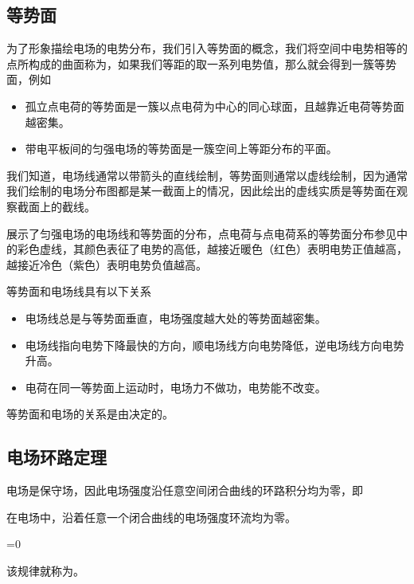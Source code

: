 \subsection{等势面}
为了形象描绘电场的电势分布，我们引入等势面的概念，我们将空间中电势相等的点所构成的曲面称为，如果我们等距的取一系列电势值，那么就会得到一簇等势面，例如
\begin{itemize}
    \item 孤立点电荷的等势面是一簇以点电荷为中心的同心球面，且越靠近电荷等势面越密集。
    \item 带电平板间的匀强电场的等势面是一簇空间上等距分布的平面。
\end{itemize}
我们知道，电场线通常以带箭头的直线绘制，等势面则通常以虚线绘制，因为通常我们绘制的电场分布图都是某一截面上的情况，因此绘出的虚线实质是等势面在观察截面上的截线。

展示了匀强电场的电场线和等势面的分布，点电荷与点电荷系的等势面分布参见中的彩色虚线，其颜色表征了电势的高低，越接近暖色（红色）表明电势正值越高，越接近冷色（紫色）表明电势负值越高。

等势面和电场线具有以下关系
\begin{itemize}
    \item 电场线总是与等势面垂直，电场强度越大处的等势面越密集。
    \item 电场线指向电势下降最快的方向，顺电场线方向电势降低，逆电场线方向电势升高。
    \item 电荷在同一等势面上运动时，电场力不做功，电势能不改变。
\end{itemize}
等势面和电场的关系是由决定的。\vspace{-3pt}

\subsection{电场环路定理}
电场是保守场，因此电场强度沿任意空间闭合曲线的环路积分均为零，即
\begin{BoxPrinciple}[电场环路定理]
    在电场中，沿着任意一个闭合曲线的电场强度环流均为零。
    \begin{BoxEq}
        =0
    \end{BoxEq}
\end{BoxPrinciple}
该规律就称为。

